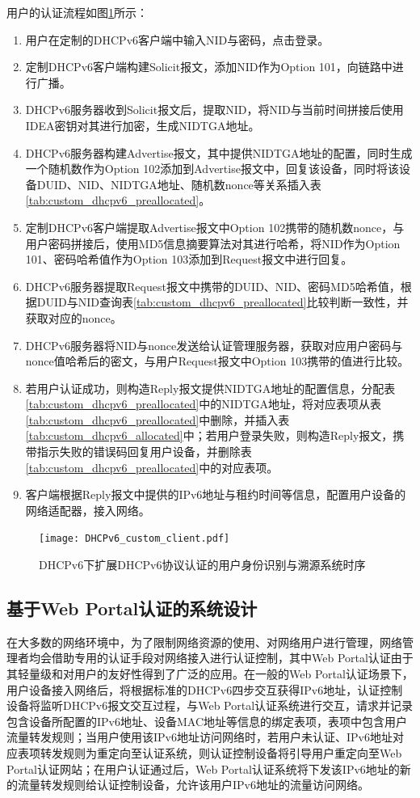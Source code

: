     用户的认证流程如图\ref{fig:DHCPv6_custom_client}所示：
    \begin{enumerate}[1{)}]
      \item 用户在定制的DHCPv6客户端中输入NID与密码，点击登录。
      \item 定制DHCPv6客户端构建Solicit报文，添加NID作为Option 101，向链路中进行广播。
      \item DHCPv6服务器收到Solicit报文后，提取NID，将NID与当前时间拼接后使用IDEA密钥对其进行加密，生成NIDTGA地址。
      \item DHCPv6服务器构建Advertise报文，其中提供NIDTGA地址的配置，同时生成一个随机数作为Option 102添加到Advertise报文中，回复该设备，同时将该设备DUID、NID、NIDTGA地址、随机数nonce等关系插入表\ref{tab:custom_dhcpv6_preallocated}。
      \item 定制DHCPv6客户端提取Advertise报文中Option 102携带的随机数nonce，与用户密码拼接后，使用MD5信息摘要算法对其进行哈希，将NID作为Option 101、密码哈希值作为Option 103添加到Request报文中进行回复。
      \item DHCPv6服务器提取Request报文中携带的DUID、NID、密码MD5哈希值，根据DUID与NID查询表\ref{tab:custom_dhcpv6_preallocated}比较判断一致性，并获取对应的nonce。
      \item DHCPv6服务器将NID与nonce发送给认证管理服务器，获取对应用户密码与nonce值哈希后的密文，与用户Request报文中Option 103携带的值进行比较。
      \item 若用户认证成功，则构造Reply报文提供NIDTGA地址的配置信息，分配表\ref{tab:custom_dhcpv6_preallocated}中的NIDTGA地址，将对应表项从表\ref{tab:custom_dhcpv6_preallocated}中删除，并插入表\ref{tab:custom_dhcpv6_allocated}中；若用户登录失败，则构造Reply报文，携带指示失败的错误码回复用户设备，并删除表\ref{tab:custom_dhcpv6_preallocated}中的对应表项。
      \item 客户端根据Reply报文中提供的IPv6地址与租约时间等信息，配置用户设备的网络适配器，接入网络。
    \end{enumerate}

    \begin{figure}[ht]
      \centering
      \texttt{[image: DHCPv6\_custom\_client.pdf]}
      \caption{DHCPv6下扩展DHCPv6协议认证的用户身份识别与溯源系统时序}
      \label{fig:DHCPv6_custom_client}
    \end{figure}

    \subsection{基于Web Portal认证的系统设计}
    \label{NIDTGA:DHCPv6:portal}
    在大多数的网络环境中，为了限制网络资源的使用、对网络用户进行管理，网络管理者均会借助专用的认证手段对网络接入进行认证控制，其中Web Portal认证由于其轻量级和对用户的友好性得到了广泛的应用。在一般的Web Portal认证场景下，用户设备接入网络后，将根据标准的DHCPv6四步交互获得IPv6地址，认证控制设备将监听DHCPv6报文交互过程，与Web Portal认证系统进行交互，请求并记录包含设备所配置的IPv6地址、设备MAC地址等信息的绑定表项，表项中包含用户流量转发规则；当用户使用该IPv6地址访问网络时，若用户未认证、IPv6地址对应表项转发规则为重定向至认证系统，则认证控制设备将引导用户重定向至Web Portal认证网站；在用户认证通过后，Web Portal认证系统将下发该IPv6地址的新的流量转发规则给认证控制设备，允许该用户IPv6地址的流量访问网络。


